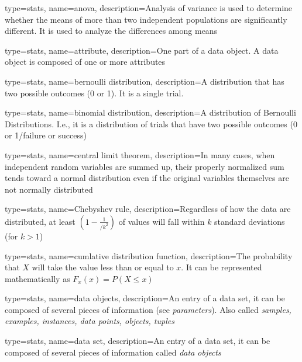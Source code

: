 

{
	type=stats,
    name=anova,
    description={Analysis of variance is used to determine whether the means of more than two independent populations are significantly different.  It is used to analyze the differences among means}
}

{
	type=stats,
    name=attribute,
    description={One part of a data object.  A data object is composed of one or more attributes}
}

{
	type=stats,
    name=bernoulli distribution,
    description={A distribution that has two possible outcomes (0 or 1).  It is a single trial.}
}

{
	type=stats,
    name=binomial distribution,
    description={A distribution of Bernoulli Distributions.  I.e., it is a distribution of trials that have two possible outcomes (0 or 1/failure or success)}
}

{
	type=stats,
    name=central limit theorem,
    description={In many cases, when independent random variables are summed up, their properly normalized sum tends toward a normal distribution even if the original variables themselves are not normally distributed}
}

{
	type=stats,
    name=Chebyshev rule,
    description={Regardless of how the data are distributed, at least $\left(1-\frac{1}{/k^2}\right)$ of values will fall within $k$ standard deviations (for $k>1$)}
}

{
	type=stats,
    name=cumlative distribution function,
    description={The probability that $X$ will take the value less than or equal to $x$.  It can be represented mathematically as $F_x\left(x\right)=P\left(X\leq{}x\right)$}
}

{
	type=stats,
    name=data objects,
    description={An entry of a data set, it can be composed of several pieces of information (see \textit{parameters}).  Also called \textit{samples, examples, instances, data points, objects, tuples}}
}

{
	type=stats,
    name=data set,
    description={An entry of a data set, it can be composed of several pieces of information called \textit{data objects}}
}

